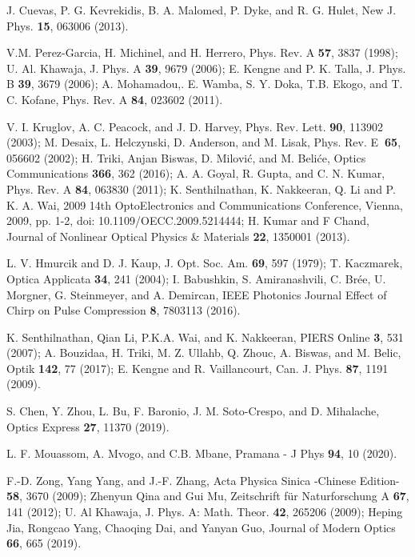 \documentclass[preprintnumbers]{revtex4}
\begin{document}
\begin{thebibliography}{99}
 J. Cuevas, P. G. Kevrekidis, B. A. Malomed, P. Dyke, and R. G.
Hulet, New J. Phys. \textbf{15}, 063006 (2013).

 V.M. Perez-Garcia, H. Michinel, and H. Herrero, Phys. Rev. A
\textbf{57}, 3837 (1998); U. Al. Khawaja, J. Phys. A \textbf{39}, 9679
(2006); E. Kengne and P. K. Talla, J. Phys. B \textbf{39}, 3679 (2006); A.
Mohamadou,. E. Wamba, S. Y. Doka, T.B. Ekogo, and T. C. Kofane, Phys. Rev. A
\textbf{84}, 023602 (2011).

 V. I. Kruglov, A. C. Peacock, and J. D. Harvey, Phys. Rev.
Lett. \textbf{90}, 113902 (2003); M. Desaix, L. Helczynski, D. Anderson, and
M. Lisak, Phys. Rev. E\textbf{\ 65}, 056602 (2002); H. Triki, Anjan Biswas,
D. Milovi\'{c}, and M. Beli\'{c}e, Optics Communications \textbf{366}, 362
(2016); A. A. Goyal, R. Gupta, and C. N. Kumar, Phys. Rev. A \textbf{84},
063830 (2011); K. Senthilnathan, K. Nakkeeran, Q. Li and P. K. A. Wai, 2009
14th OptoElectronics and Communications Conference, Vienna, 2009, pp. 1-2,
doi: 10.1109/OECC.2009.5214444; H. Kumar and F Chand, Journal of Nonlinear
Optical Physics \& Materials \textbf{22}, 1350001 (2013).

 L. V. Hmurcik and D. J. Kaup, J. Opt. Soc. Am. \textbf{69}, 597
(1979); T. Kaczmarek, Optica Applicata \textbf{34}, 241 (2004); I.
Babushkin, S. Amiranashvili, C. Br\'{e}e, U. Morgner, G. Steinmeyer, and A.
Demircan, IEEE Photonics Journal Effect of Chirp on Pulse Compression
\textbf{8}, 7803113 (2016).

 K. Senthilnathan, Qian Li, P.K.A. Wai, and K. Nakkeeran, PIERS
Online \textbf{3}, 531 (2007); A. Bouzidaa, H. Triki, M. Z. Ullahb, Q.
Zhouc, A. Biswas, and M. Belic, Optik \textbf{142}, 77 (2017); E. Kengne and
R. Vaillancourt, Can. J. Phys. \textbf{87}, 1191 (2009).

 S. Chen, Y. Zhou, L. Bu, F. Baronio, J. M. Soto-Crespo, and D.
Mihalache, Optics Express \textbf{27}, 11370 (2019).

 L. F. Mouassom, A. Mvogo, and C.B. Mbane, Pramana - J Phys
\textbf{94}, 10 (2020).

 F.-D. Zong, Yang Yang, and J.-F. Zhang, Acta Physica Sinica
-Chinese Edition- \textbf{58}, 3670 (2009); Zhenyun Qina and Gui Mu,
Zeitschrift f\"{u}r Naturforschung A \textbf{67}, 141 (2012); U. Al Khawaja,
J. Phys. A: Math. Theor. \textbf{42}, 265206 (2009); Heping Jia, Rongcao
Yang, Chaoqing Dai, and Yanyan Guo, Journal of Modern Optics \textbf{66},
665 (2019).


\end{thebibliography}
\end{document}
